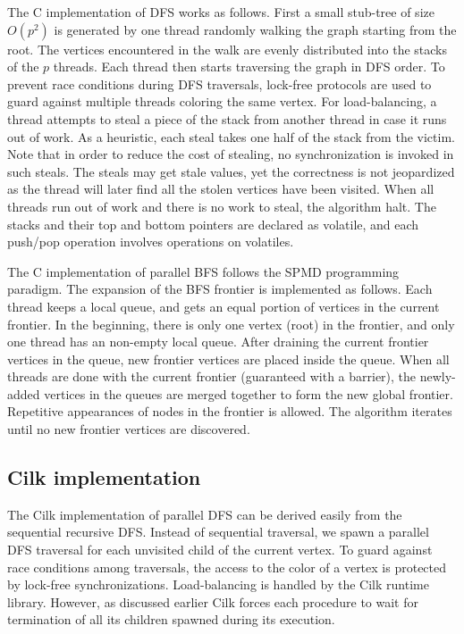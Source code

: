 The C implementation of DFS works as follows. First a small stub-tree
of size $O(p^2)$ is generated by one thread randomly walking the graph
starting from the root.  The vertices encountered in the walk are
evenly distributed into the stacks of the $p$ threads. Each thread
then starts traversing the graph in DFS order.  To prevent race
conditions during DFS traversals, lock-free protocols are used to
guard against multiple threads coloring the same vertex. For
load-balancing, a thread attempts to steal a piece of the stack from
another thread in case it runs out of work. As a heuristic, each steal
takes one half of the stack from the victim. Note that in order to
reduce the cost of stealing, no synchronization is invoked in such
steals. The steals may get stale values, yet the correctness is not
jeopardized as the thread will later find all the stolen vertices have
been visited.  When all threads run out of work and there is no work
to steal, the algorithm halt. The stacks and their top and bottom
pointers are declared as volatile, and each push/pop operation
involves operations on volatiles.

The C implementation of parallel BFS follows the SPMD programming
paradigm. The expansion of the BFS frontier is implemented as
follows. Each thread keeps a local queue, and gets an equal portion of
vertices in the current frontier. In the beginning, there is only one
vertex (root) in the frontier, and only one thread has an non-empty
local queue. After draining the current frontier vertices in the
queue, new frontier vertices are placed inside the queue. When all
threads are done with the current frontier (guaranteed with a
barrier), the newly-added vertices in the queues are merged together
to form the new global frontier. Repetitive appearances of nodes in
the frontier is allowed. The algorithm iterates until no new frontier
vertices are discovered.

\subsection{Cilk implementation}

The Cilk implementation of parallel DFS can be derived easily from the
sequential recursive DFS. Instead of sequential traversal, we spawn a
parallel DFS traversal for each unvisited child of the
current vertex. To guard against race conditions among traversals, the
access to the color of a vertex is protected by lock-free
synchronizations. Load-balancing is handled by the Cilk runtime
library. However, as discussed earlier Cilk forces each procedure to
wait for termination of all its children spawned during its execution.

